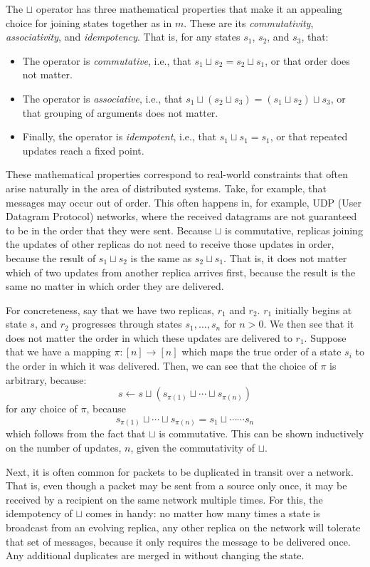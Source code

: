 The $\sqcup$ operator has three mathematical properties that make it an
appealing choice for joining states together as in $m$. These are its
\emph{commutativity}, \emph{associativity}, and \emph{idempotency}. That is, for
any states $s_1$, $s_2$, and $s_3$, that:
\begin{itemize}
  \item The operator is \emph{commutative}, i.e., that $s_1 \sqcup s_2 = s_2
    \sqcup s_1$, or that order does not matter.
  \item The operator is \emph{associative}, i.e., that $s_1 \sqcup (s_2 \sqcup
    s_3) = (s_1 \sqcup s_2) \sqcup s_3$, or that grouping of arguments does not
    matter.
  \item Finally, the operator is \emph{idempotent}, i.e., that $s_1 \sqcup s_1 =
    s_1$, or that repeated updates reach a fixed point.
\end{itemize}

These mathematical properties correspond to real-world constraints that often
arise naturally in the area of distributed systems. Take, for example, that
messages may occur out of order. This often happens in, for example, UDP (User
Datagram Protocol) networks, where the received datagrams are not guaranteed to
be in the order that they were sent. Because $\sqcup$ is commutative, replicas
joining the updates of other replicas do not need to receive those updates in
order, because the result of $s_1 \sqcup s_2$ is the same as $s_2 \sqcup s_1$.
That is, it does not matter which of two updates from another replica arrives
first, because the result is the same no matter in which order they are
delivered.

For concreteness, say that we have two replicas, $r_1$ and $r_2$. $r_1$
initially begins at state $s$, and $r_2$ progresses through states $s_1, \ldots,
s_n$ for $n > 0$. We then see that it does not matter the order in which these
updates are delivered to $r_1$. Suppose that we have a mapping $\pi : [n] \to
[n]$ which maps the true order of a state $s_i$ to the order in which it was
delivered. Then, we can see that the choice of $\pi$ is arbitrary, because:
\[
  s \gets s \sqcup (s_{\pi(1)} \sqcup \cdots \sqcup s_{\pi(n)})
\]
for any choice of $\pi$, because
\[
  s_{\pi(1)} \sqcup \cdots \sqcup s_{\pi(n)} = s_1 \sqcup \cdots \cdots s_n
\]
which follows from the fact that $\sqcup$ is commutative. This can be shown
inductively on the number of updates, $n$, given the commutativity of $\sqcup$.

Next, it is often common for packets to be duplicated in transit over a network.
That is, even though a packet may be sent from a source only once, it may be
received by a recipient on the same network multiple times. For this, the
idempotency of $\sqcup$ comes in handy: no matter how many times a state is
broadcast from an evolving replica, any other replica on the network will
tolerate that set of messages, because it only requires the message to be
delivered once. Any additional duplicates are merged in without changing the
state.

